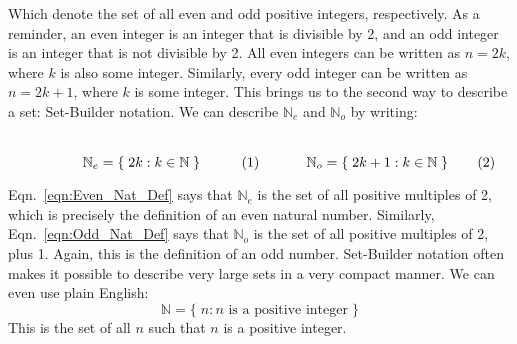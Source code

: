         \par\vspace{2.5ex}
        Which denote the set of all even and odd positive integers,
        respectively. As a reminder, an even integer is an integer that
        is divisible by 2, and an odd integer is an integer that is not
        divisible by 2. All even integers can be written as $n=2k$,
        where $k$ is also some integer. Similarly, every odd integer can
        be written as $n=2k+1$, where $k$ is some integer. This brings
        us to the second way to describe a set: Set-Builder notation.
        We can describe $\mathbb{N}_{e}$ and $\mathbb{N}_{o}$ by writing:
        \par
        \begin{subequations}
            \begin{minipage}{0.49\textwidth}
                \centering
                \begin{equation}
                    \label{eqn:Even_Nat_Def}%
                    \mathbb{N}_{e}=\{\;2k:k\in\mathbb{N}\;\}
                \end{equation}
            \end{minipage}
            \hfill
            \begin{minipage}{0.49\textwidth}
                \centering
                \begin{equation}
                    \label{eqn:Odd_Nat_Def}%
                    \mathbb{N}_{o}=\{\;2k+1:k\in\mathbb{N}\;\}
                \end{equation}
            \end{minipage}
        \end{subequations}
        \par\vspace{2.5ex}
        Eqn.~\ref{eqn:Even_Nat_Def} says that $\mathbb{N}_{e}$ is the
        set of all positive multiples of 2, which is precisely the
        definition of an even natural number. Similarly,
        Eqn.~\ref{eqn:Odd_Nat_Def} says that $\mathbb{N}_{o}$ is the set
        of all positive multiples of 2, plus 1. Again, this is the
        definition of an odd number. Set-Builder notation often makes
        it possible to describe very large sets in a very compact manner.
        We can even use plain English:
        \begin{equation}
            \mathbb{N}=\{\;n:n\textrm{ is a positive integer}\;\}
        \end{equation}
        This is the set of all $n$ such that $n$ is a positive integer.
